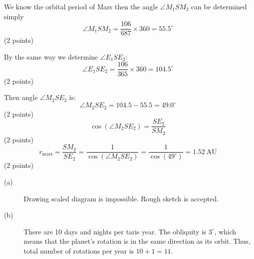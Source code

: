 We know the orbital period of Mars then the angle $\angle M_1 S M_2$ can be
determined simply
\[
\angle M_1 S M_2 = \frac{106}{687}\times 360 = 55.5^\circ
\]
\hfill(2 points)

By the same way we determine $\angle E_1 S E_2$:
\[
\angle E_1 S E_2 = \frac{106}{365}\times 360 = 104.5^\circ
\]
\hfill(2 points)

Then angle $\angle M_2 S E_2$ is:
\[
\angle M_2 S E_2 = 104.5 - 55.5 = 49.0^\circ
\]
\hfill(2 points)
\[
\cos(\angle M_2 S E_2) = \frac{SE_2}{SM_2}
\]
\hfill(2 points)
\[
r_{\mathrm{mars}} = \frac{SM_2}{SE_2}
 = \frac{1}{\cos(\angle M_2 S E_2)}
 = \frac{1}{\cos(49^\circ)} = 1.52\ \mathrm{AU}
\]
\hfill(2 points)

\begin{description}
\item[(a)] Drawing scaled diagram is impossible. Rough sketch is accepted.
\item[(b)] There are 10 days and nights per taris year. The obliquity is
  $3^\circ$, which means that the planet's rotation is in the same direction
  as its orbit. Thus, total number of rotations per year is $10 + 1 = 11$.


\end{description}
